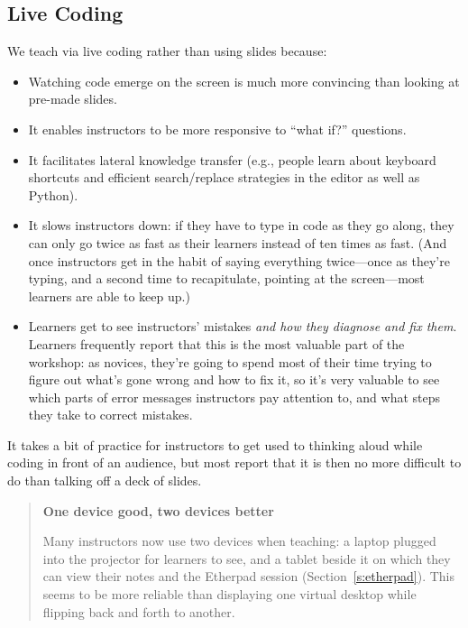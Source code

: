 \documentclass[10pt,a4paper,twocolumn]{article}
\begin{document}
\subsection{Live Coding}

We teach via live coding rather than using slides because:

\begin{itemize}

\item Watching code emerge on the screen is much more convincing than
  looking at pre-made slides.

\item It enables instructors to be more responsive to ``what if?''
  questions.

\item It facilitates lateral knowledge transfer (e.g., people learn
  about keyboard shortcuts and efficient search/replace strategies in
  the editor as well as Python).

\item It slows instructors down: if they have to type in code as they
  go along, they can only go twice as fast as their learners instead
  of ten times as fast.  (And once instructors get in the habit of
  saying everything twice---once as they're typing, and a second time
  to recapitulate, pointing at the screen---most learners are able to
  keep up.)

\item Learners get to see instructors' mistakes \emph{and how they
  diagnose and fix them}.  Learners frequently report that this is the
  most valuable part of the workshop: as novices, they're going to
  spend most of their time trying to figure out what's gone wrong and
  how to fix it, so it's very valuable to see which parts of error
  messages instructors pay attention to, and what steps they take to
  correct mistakes.

\end{itemize}

It takes a bit of practice for instructors to
get used to thinking aloud while coding in front of an audience, but
most report that it is then no more difficult to do than talking off a
deck of slides.

\begin{quote}
\textbf{One device good, two devices better}

Many instructors now use two devices when teaching: a laptop plugged
into the projector for learners to see, and a tablet beside it on
which they can view their notes and the Etherpad session
(Section~\ref{s:etherpad}).  This seems to be more reliable than
displaying one virtual desktop while flipping back and forth to
another.
\end{quote}
\end{document}

